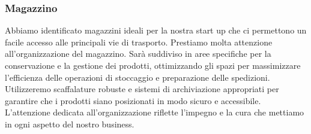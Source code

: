 \documentclass[12pt, a4paper]{article}
\begin{document}
\subsubsection{Magazzino}
Abbiamo identificato magazzini ideali per la nostra start up che ci permettono un facile accesso alle principali vie di trasporto.
Prestiamo molta attenzione all'organizzazione del magazzino. Sarà suddiviso in aree specifiche per la conservazione e la gestione dei prodotti, ottimizzando gli spazi per massimizzare l'efficienza delle operazioni di stoccaggio e preparazione delle spedizioni. Utilizzeremo scaffalature robuste e sistemi di archiviazione appropriati per garantire che i prodotti siano posizionati in modo sicuro e accessibile.
L'attenzione dedicata all'organizzazione riflette l'impegno e la cura che mettiamo in ogni aspetto del nostro business.
\end{document}
